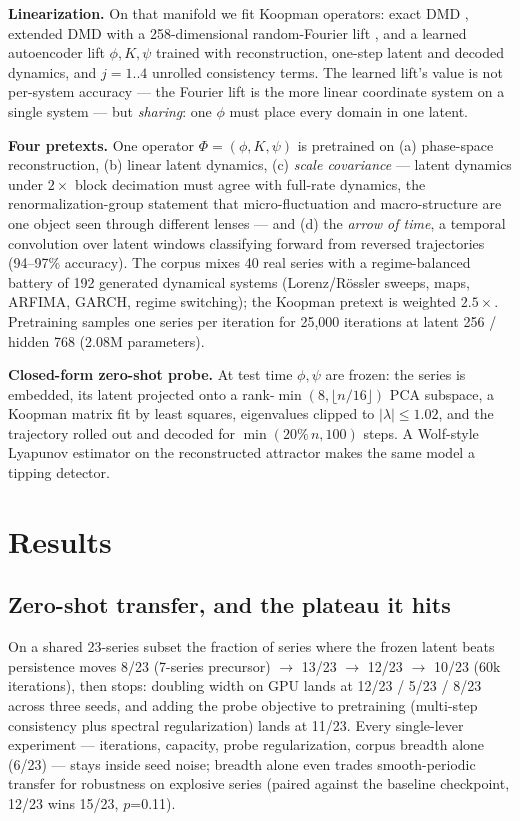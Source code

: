 \documentclass{article}
\begin{document}
\textbf{Linearization.} On that manifold we fit Koopman operators: exact DMD
\cite{schmid2010}, extended DMD with a 258-dimensional random-Fourier lift
\cite{williams2015}, and a learned autoencoder lift $\phi,K,\psi$ trained with
reconstruction, one-step latent and decoded dynamics, and $j{=}1..4$ unrolled
consistency terms. The learned lift's value is not per-system accuracy --- the
Fourier lift is the more linear coordinate system on a single system --- but
\emph{sharing}: one $\phi$ must place every domain in one latent.

\textbf{Four pretexts.} One operator $\Phi=(\phi,K,\psi)$ is pretrained on
(a) phase-space reconstruction, (b) linear latent dynamics, (c) \emph{scale
covariance} --- latent dynamics under $2\times$ block decimation must agree with
full-rate dynamics, the renormalization-group statement that micro-fluctuation
and macro-structure are one object seen through different lenses --- and (d)
the \emph{arrow of time}, a temporal convolution over latent windows
classifying forward from reversed trajectories (94--97\% accuracy). The corpus
mixes 40 real series with a regime-balanced battery of 192 generated dynamical
systems (Lorenz/R\"ossler sweeps, maps, ARFIMA, GARCH, regime switching); the
Koopman pretext is weighted $2.5\times$. Pretraining samples one series per
iteration for 25{,}000 iterations at latent 256 / hidden 768 (2.08M parameters).

\textbf{Closed-form zero-shot probe.} At test time $\phi,\psi$ are frozen: the
series is embedded, its latent projected onto a
rank-$\min(8,\lfloor n/16\rfloor)$ PCA subspace, a Koopman matrix fit by least
squares, eigenvalues clipped to $|\lambda|\le1.02$, and the trajectory rolled
out and decoded for $\min(20\%\,n,100)$ steps. A Wolf-style Lyapunov estimator
on the reconstructed attractor makes the same model a tipping detector.

\section{Results}
\label{sec:results}
\subsection{Zero-shot transfer, and the plateau it hits}
\label{sec:transfer}
On a shared 23-series subset the fraction of series where the frozen latent
beats persistence moves 8/23 (7-series precursor) $\rightarrow$
13/23 $\rightarrow$ 12/23 $\rightarrow$ 10/23 (60k iterations),
then stops: doubling width on GPU lands at 12/23 / 5/23 / 8/23 across three seeds, and
adding the probe objective to pretraining (multi-step consistency plus spectral
regularization) lands at 11/23. Every single-lever
experiment --- iterations, capacity, probe regularization, corpus breadth alone
(6/23) --- stays inside seed noise; breadth alone even trades
smooth-periodic transfer for robustness on explosive series (paired against the
baseline checkpoint, 12/23 wins 15/23, $p$=0.11).
\end{document}
